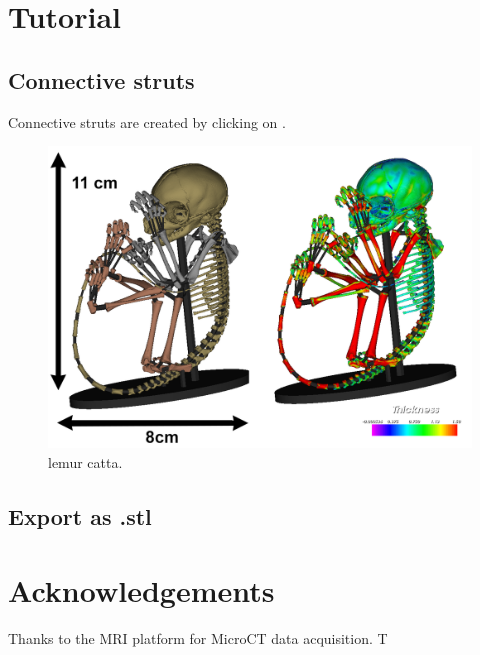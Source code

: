 \documentclass[12pt, a4paper]{book}
\begin{document}
\section{Tutorial}

\subsection{Connective struts}
Connective struts are created by clicking on .\\ 


\begin{figure}
  \centering
  \includegraphics[scale=0.5]{lemur_catta.png} 
	\caption{lemur catta.}
\label{lemur_catta}
\end{figure}

\subsection{Export as .stl}


\section{Acknowledgements}
Thanks to the MRI platform for MicroCT data acquisition. T




%	
\end{document}
